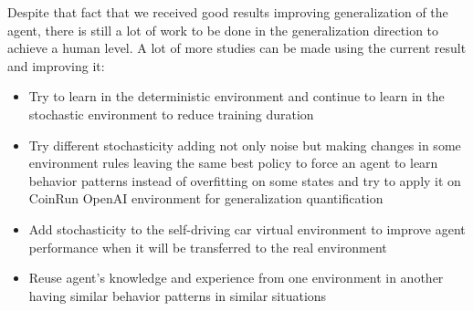 Despite that fact that we received good results improving generalization of the agent, there is still a lot of work to be done in the generalization direction to achieve a human level. A lot of more studies can be made using the current result and improving it:
\begin{itemize}
    \item Try to learn in the deterministic environment and continue to learn in the stochastic environment to reduce training duration
    \item Try different stochasticity adding not only noise but making changes in some environment rules leaving the same best policy to force an agent to learn behavior patterns instead of overfitting on some states and try to apply it on CoinRun OpenAI environment for generalization quantification \cite{CoinRun}
    \item Add stochasticity to the self-driving car virtual environment to improve agent performance when it will be transferred to the real environment
    \item Reuse agent's knowledge and experience from one environment in another having similar behavior patterns in similar situations
\end{itemize}

\newpage
\printbibliography
